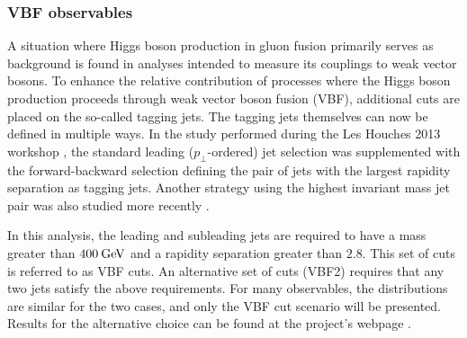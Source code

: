 \subsubsection{VBF observables}
\label{sec:hjetscomp:results:VBFobs}

A situation where Higgs boson production in gluon fusion primarily
serves as background is found in analyses intended to measure its
couplings to weak vector bosons. To enhance the relative contribution
of processes where the Higgs boson production proceeds through weak
vector boson fusion (VBF), additional cuts are placed on the so-called
tagging jets. The tagging jets themselves can now be defined in
multiple ways. In the study performed during the Les Houches 2013
workshop \cite{AlcarazMaestre:2012vp}, the standard leading
($p_\perp$-ordered) jet selection was supplemented with the
forward-backward selection defining the pair of jets with the largest
rapidity separation as tagging jets. Another strategy using the
highest invariant mass jet pair was also studied more recently
\cite{Greiner:2015jha}.


In this analysis, the leading and subleading jets are required to have
a mass greater than $400\text{\:GeV}$ and a rapidity separation greater than
$2.8$. This set of cuts is referred to as VBF cuts. An alternative set
of cuts (VBF2) requires that any two jets satisfy the above
requirements. For many observables, the distributions are similar for
the two cases, and only the VBF cut scenario will be presented.
Results for the alternative choice can be found at the project's
webpage \cite{webpage}.

